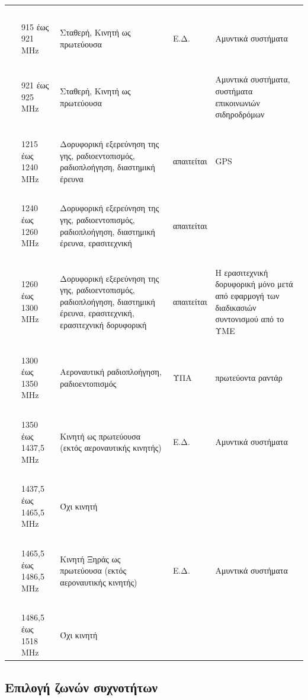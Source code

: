 \documentclass[a4paper, 12pt, twoside]{report}
\begin{document}
{{{{{{\begin{landscape}
\begin{longtable} { m{3cm} m{4cm} m{4cm} m{3cm} m{5cm} }
					\hdashline
					~\\
					& 915 έως 921 MHz & Σταθερή, Κινητή ως πρωτεύουσα & Ε.Δ. & Αμυντικά συστήματα\\
					\hdashline
					~\\
					& 921 έως 925 MHz & Σταθερή, Κινητή ως πρωτεύουσα & & Αμυντικά συστήματα, συστήματα επικοινωνιών σιδηροδρόμων\\
					\hdashline
					~\\
					& 1215 έως 1240 MHz & Δορυφορική εξερεύνηση της γης, ραδιοεντοπισμός, ραδιοπλοήγηση, διαστημική έρευνα & απαιτείται & GPS\\
					\hdashline
					~\\
					& 1240 έως 1260 MHz & Δορυφορική εξερεύνηση της γης, ραδιοεντοπισμός, ραδιοπλοήγηση, διαστημική έρευνα, ερασιτεχνική & απαιτείται & \\
					\hdashline
					~\\
					& 1260 έως 1300 MHz & Δορυφορική εξερεύνηση της γης, ραδιοεντοπισμός, ραδιοπλοήγηση, διαστημική έρευνα, ερασιτεχνική, ερασιτεχνική δορυφορική & απαιτείται & Η ερασιτεχνική δορυφορική μόνο μετά από εφαρμογή των διαδικασιών συντονισμού από το ΥΜΕ\\
					\hdashline
					~\\
					& 1300 έως 1350 MHz & Αεροναυτική ραδιοπλοήγηση, ραδιοεντοπισμός & ΥΠΑ & πρωτεύοντα ραντάρ\\
					\hdashline
					~\\
					& 1350 έως 1437,5 MHz & Κινητή ως πρωτεύουσα (εκτός αεροναυτικής κινητής)  & Ε.Δ. & Αμυντικά συστήματα\\
					\hdashline
					~\\
					& 1437,5 έως 1465,5 MHz & Όχι κινητή & & \\
					\hdashline
					~\\
					& 1465,5 έως 1486,5 MHz & Κινητή Ξηράς ως πρωτεύουσα (εκτός αεροναυτικής κινητής) & Ε.Δ. & Αμυντικά συστήματα\\
					\hdashline
					~\\
					& 1486,5 έως 1518 MHz & Όχι κινητή & & \\
					\hline
			\end{longtable}
			\end{landscape}
		
		\subsection{Επιλογή ζωνών συχνοτήτων}		
			
}}}}}}
\end{document}
